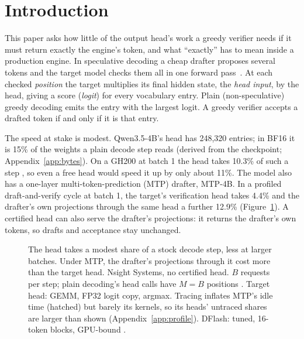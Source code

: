 \section{Introduction}\label{sec:intro}\label{sec:question}
This paper asks how little of the output head's work a greedy verifier needs if it must return exactly the engine's token, and what ``exactly'' has to mean inside a production engine. In speculative decoding a cheap drafter proposes several tokens and the target model checks them all in one forward pass~\cite{specdecode,chen2023specsampling}. At each checked \emph{position} the target multiplies its final hidden state, the \emph{head input}, by the head, giving a score (\emph{logit}) for every vocabulary entry. Plain (non-speculative) greedy decoding emits the entry with the largest logit. A greedy verifier accepts a drafted token if and only if it is that entry.

The speed at stake is modest. Qwen3.5-4B's head has 248,320 entries; in BF16 it is 15\% of the weights a plain decode step reads (derived from the checkpoint; Appendix~\ref{app:bytes}). On a GH200 at batch 1 the head takes 10.3\% of such a step , so even a free head would speed it up by only about 11\%. The model also has a one-layer multi-token-prediction (MTP) drafter, MTP-4B. In a profiled draft-and-verify cycle at batch 1, the target's verification head takes 4.4\%  and the drafter's own projections through the same head a further 12.9\% (Figure~\ref{fig:breakdown}). A certified head can also serve the drafter's projections: it returns the drafter's own tokens, so drafts and acceptance stay unchanged.

\begin{figure}[t]
\centering
%
\caption{The head takes a modest share of a stock decode step, less at larger batches. Under MTP, the drafter's projections through it cost more than the target head. Nsight Systems, no certified head. $B$ requests per step; plain decoding's head calls have $M=B$ positions . Target head: GEMM, FP32 logit copy, argmax. Tracing inflates MTP's idle time (hatched) but barely its kernels, so its heads' untraced shares are larger than shown (Appendix~\ref{app:profile}). DFlash: tuned, 16-token blocks, GPU-bound .}
\label{fig:breakdown}
\end{figure}

